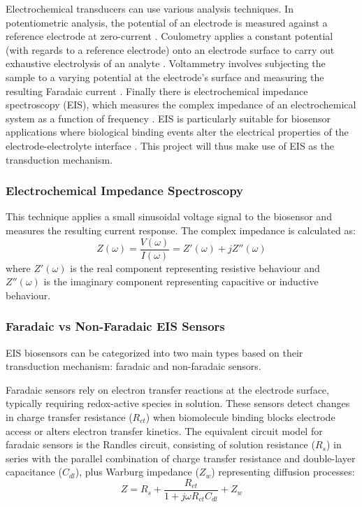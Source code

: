 Electrochemical transducers can use various analysis techniques. In potentiometric analysis, the potential of an electrode is measured against a reference electrode at zero-current \cite{magarElectrochemicalImpedanceSpectroscopy2021}. Coulometry applies a constant potential (with regards to a reference electrode) onto an electrode surface to carry out exhaustive electrolysis of an analyte \cite{magarElectrochemicalImpedanceSpectroscopy2021}. Voltammetry involves subjecting the sample to a varying potential at the electrode's surface and measuring the resulting Faradaic current \cite{magarElectrochemicalImpedanceSpectroscopy2021}. Finally there is electrochemical impedance spectroscopy (EIS), which measures the complex impedance of an electrochemical system as a function of frequency \cite{magarElectrochemicalImpedanceSpectroscopy2021}. EIS is particularly suitable for biosensor applications where biological binding events alter the electrical properties of the electrode-electrolyte interface \cite{danielsLabelFreeImpedanceBiosensors2007}. This project will thus make use of EIS as the transduction mechanism.

\subsubsection{Electrochemical Impedance Spectroscopy}
This technique applies a small sinusoidal voltage signal to the biosensor and measures the resulting current response. The complex impedance is calculated as:
\begin{equation}
    Z(\omega) = \frac{V(\omega)}{I(\omega)} = Z'(\omega) + jZ''(\omega)
\end{equation}
where $Z'(\omega)$ is the real component representing resistive behaviour and $Z''(\omega)$ is the imaginary component representing capacitive or inductive behaviour.\cite{orazemTutorialElectrochemicalImpedance2020}

\subsubsection{Faradaic vs Non-Faradaic EIS Sensors}
EIS biosensors can be categorized into two main types based on their transduction mechanism: faradaic and non-faradaic sensors.\cite{dorledodefariaFaradaicNonfaradaicElectrochemical2019}

Faradaic sensors rely on electron transfer reactions at the electrode surface, typically requiring redox-active species in solution. These sensors detect changes in charge transfer resistance ($R_{ct}$) when biomolecule binding blocks electrode access or alters electron transfer kinetics. The equivalent circuit model for faradaic sensors is the Randles circuit, consisting of solution resistance ($R_s$) in series with the parallel combination of charge transfer resistance and double-layer capacitance ($C_{dl}$), plus Warburg impedance ($Z_w$) representing diffusion processes:
\begin{equation}
    Z = R_s + \frac{R_{ct}}{1 + j\omega R_{ct}C_{dl}} + Z_w
\end{equation}


